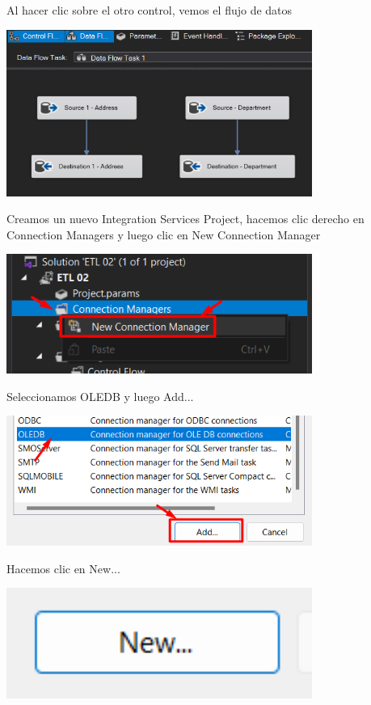 \documentclass[12pt,letterpaper]{article}
\begin{document}
Al hacer clic sobre el otro control, vemos el flujo de datos

\begin{center}
    \includegraphics[width=10cm]{./img/img13.png}
\end{center}

Creamos un nuevo Integration Services Project, hacemos clic derecho en Connection Managers y luego clic en New Connection Manager

\begin{center}
    \includegraphics[width=10cm]{./img/img15.png}
\end{center}

Seleccionamos OLEDB y luego Add...

\begin{center}
    \includegraphics[width=10cm]{./img/img16.png}
\end{center}

Hacemos clic en New...

\begin{center}
    \includegraphics[width=10cm]{./img/img17.png}
\end{center}
\end{document}
